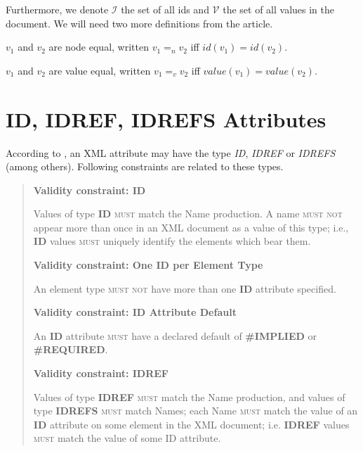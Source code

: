 Furthermore, we denote $\mathcal{I}$ the set of all ids and $\mathcal{V}$ the set of all values in the document. We will need two more definitions from the article.

\begin{define}
	$v_1$ and $v_2$ are node equal, written $v_1 =_n v_2$ iff $id(v_1) = id(v_2)$.
\end{define}

\begin{define}
	$v_1$ and $v_2$ are value equal, written $v_1 =_v v_2$ iff $value(v_1) = value(v_2)$.
\end{define}

\section{ID, IDREF, IDREFS Attributes}
\label{section-definitions-id-attributes}

According to \cite{Bray:08:EML}, an XML attribute may have the type \textit{ID}, \textit{IDREF} or \textit{IDREFS} (among others). Following constraints are related to these types.

\begin{quote}
\textbf{Validity constraint: ID}

Values of type \textbf{ID} \textsc{must} match the Name production. A name \textsc{must not} appear more than once in an XML document as a value of this type; i.e., \textbf{ID} values \textsc{must} uniquely identify the elements which bear them.

\textbf{Validity constraint: One ID per Element Type}

An element type \textsc{must not} have more than one \textbf{ID} attribute specified.

\textbf{Validity constraint: ID Attribute Default}

An \textbf{ID} attribute \textsc{must} have a declared default of \textbf{\#IMPLIED} or \textbf{\#REQUIRED}.

\textbf{Validity constraint: IDREF}

Values of type \textbf{IDREF} \textsc{must} match the Name production, and values of type \textbf{IDREFS} \textsc{must} match Names; each Name \textsc{must} match the value of an \textbf{ID} attribute on some element in the XML document; i.e. \textbf{IDREF} values \textsc{must} match the value of some ID attribute.
\end{quote}


